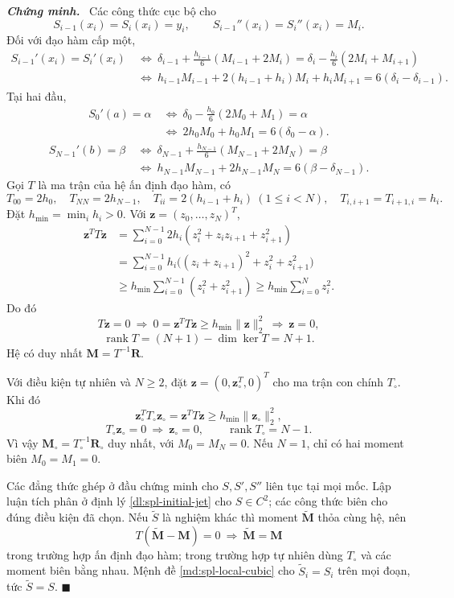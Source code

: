 \documentclass[12pt,a4paper,oneside]{book}
\numberwithin{algorithm}{chapter}
\theoremstyle{definition}
\newenvironment{chungminh}{\par\medskip\noindent\textbf{\textit{\color{mainblue}Chứng minh.}}\ }{\hfill$\blacksquare$\par\medskip}
\begin{document}
\begin{chungminh}
Các công thức cục bộ cho
\[
 S_{i-1}(x_i)=S_i(x_i)=y_i,\qquad
 S_{i-1}''(x_i)=S_i''(x_i)=M_i.
\]
Đối với đạo hàm cấp một,
\begin{align*}
 S_{i-1}'(x_i)=S_i'(x_i)
 &\ \Longleftrightarrow\
 \delta_{i-1}+\frac{h_{i-1}}6(M_{i-1}+2M_i)
 =\delta_i-\frac{h_i}6(2M_i+M_{i+1})\\
 &\ \Longleftrightarrow\
 h_{i-1}M_{i-1}+2(h_{i-1}+h_i)M_i+h_iM_{i+1}
 =6(\delta_i-\delta_{i-1}).
\end{align*}
Tại hai đầu,
\begin{align*}
 S_0'(a)=\alpha&\ \Longleftrightarrow\ \delta_0-\frac{h_0}6(2M_0+M_1)=\alpha\\
 &\ \Longleftrightarrow\ 2h_0M_0+h_0M_1=6(\delta_0-\alpha).
\end{align*}
\begin{align*}
 S_{N-1}'(b)=\beta&\ \Longleftrightarrow\ \delta_{N-1}+\frac{h_{N-1}}6(M_{N-1}+2M_N)=\beta\\
 &\ \Longleftrightarrow\ h_{N-1}M_{N-1}+2h_{N-1}M_N=6(\beta-\delta_{N-1}).
\end{align*}
Gọi $T$ là ma trận của hệ ấn định đạo hàm, có
\[
 T_{00}=2h_0,\quad T_{NN}=2h_{N-1},\quad
 T_{ii}=2(h_{i-1}+h_i)\ (1\leq i<N),\quad
 T_{i,i+1}=T_{i+1,i}=h_i.
\]
Đặt $h_{\min}=\min_i h_i>0$. Với $\mathbf z=(z_0,\ldots,z_N)^T$,
\begin{align*}
 \mathbf z^TT\mathbf z
 &=\sum_{i=0}^{N-1}2h_i(z_i^2+z_iz_{i+1}+z_{i+1}^2)\\
 &=\sum_{i=0}^{N-1}h_i\bigl((z_i+z_{i+1})^2+z_i^2+z_{i+1}^2\bigr)\\
 &\geq h_{\min}\sum_{i=0}^{N-1}(z_i^2+z_{i+1}^2)
 \geq h_{\min}\sum_{i=0}^Nz_i^2.
\end{align*}
Do đó
\[
 T\mathbf z=0\ \Longrightarrow\
 0=\mathbf z^TT\mathbf z\geq h_{\min}\|\mathbf z\|_2^2
 \ \Longrightarrow\ \mathbf z=0,
\]
\[
 \operatorname{rank}T=(N+1)-\dim\ker T=N+1.
\]
Hệ có duy nhất $\mathbf M=T^{-1}\mathbf R$.

Với điều kiện tự nhiên và $N\geq2$, đặt $\mathbf z=(0,\mathbf z_\circ^T,0)^T$ cho ma trận con chính $T_\circ$. Khi đó
\[
 \mathbf z_\circ^TT_\circ\mathbf z_\circ
 =\mathbf z^TT\mathbf z
 \geq h_{\min}\|\mathbf z_\circ\|_2^2,
\]
\[
 T_\circ\mathbf z_\circ=0\ \Longrightarrow\ \mathbf z_\circ=0,
 \qquad \operatorname{rank}T_\circ=N-1.
\]
Vì vậy $\mathbf M_\circ=T_\circ^{-1}\mathbf R_\circ$ duy nhất, với $M_0=M_N=0$. Nếu $N=1$, chỉ có hai moment biên $M_0=M_1=0$.

Các đẳng thức ghép ở đầu chứng minh cho $S,S',S''$ liên tục tại mọi mốc. Lập luận tích phân ở định lý \ref{dl:spl-initial-jet} cho $S\in C^2$; các công thức biên cho đúng điều kiện đã chọn. Nếu $\widetilde S$ là nghiệm khác thì moment $\widetilde{\mathbf M}$ thỏa cùng hệ, nên
\[
 T(\widetilde{\mathbf M}-\mathbf M)=0
 \ \Longrightarrow\ \widetilde{\mathbf M}=\mathbf M
\]
trong trường hợp ấn định đạo hàm; trong trường hợp tự nhiên dùng $T_\circ$ và các moment biên bằng nhau. Mệnh đề \ref{md:spl-local-cubic} cho $\widetilde S_i=S_i$ trên mọi đoạn, tức $\widetilde S=S$.
\end{chungminh}
\end{document}
